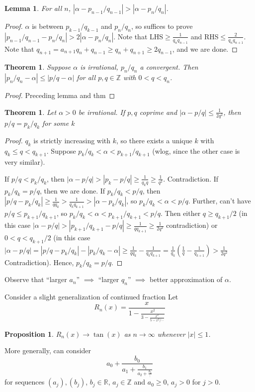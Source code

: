 \documentclass{article}
\theoremstyle{definition}
\theoremstyle{remark}
\theoremstyle{plain}
\newtheorem{lem}[defn]{Lemma}
\newtheorem{thm}[defn]{Theorem}
\newtheorem{prop}[defn]{Proposition}
\newcommand{\ZZ}{\mathbb{Z}}
\newcommand{\RR}{\mathbb{R}}
\begin{document}
\begin{lem}
    For all $n$, $|\alpha-p_{n-1}/q_{n-1}|>|\alpha-p_n/q_n|$.
\end{lem}
\begin{proof}
    $\alpha$ is between $p_{k-1}/q_{k-1}$ and $p_n/q_n$, so suffices to prove $|p_{n-1}/q_{n-1}-p_n/q_n|>2|\alpha-p_n/q_n|$. Note that LHS$\ge\frac{1}{q_nq_{n-1}}$ and RHS$\le\frac{2}{q_nq_{n+1}}$. Note that $q_{n+1}=a_{n+1}q_n+q_{n-1}\ge q_n+q_{n+1}\ge 2q_{n-1}$, and we are done.
\end{proof}
\begin{thm}
    Suppose $\alpha$ is irrational, $p_n/q_n$ a convergent. Then $|p_n/q_n-\alpha|\le |p/q-\alpha|$ for all $p,q\in\ZZ$ with $0<q<q_n$.
\end{thm}
\begin{proof}
    Preceding lemma and thm
\end{proof}
\begin{thm}
    Let $\alpha>0$ be irrational.
    If $p,q$ coprime and $|\alpha-p/q|\le \frac{1}{2q^2}$, then $p/q=p_k/q_k$ for some $k$
\end{thm}
\begin{proof}
    $q_k$ is strictly increasing with $k$, so there exists a unique $k$ with $q_k\le q<q_{k+1}$. Suppose $p_k/q_k<\alpha<p_{k+1}/q_{k+1}$ (wlog, since the other case is very similar).

    If $p/q<p_k/q_k$, then $|\alpha-p/q|>|p_k-p/q|\ge \frac{1}{q_kq}\ge \frac{1}{q^2}$. Contradiction. If $p_k/q_k=p/q$, then we are done. If $p_k/q_k<p/q$, then $|p/q-p_k/q_k|\ge \frac{1}{qq_k}>\frac{1}{q_kq_{k+1}}>|\alpha-p_k/q_k|$, so $p_k/q_k<\alpha<p/q$. Further, can't have $p/q\le p_{k+1}/q_{k+1}$, so $p_k/q_k<\alpha<p_{k+1}/q_{k+1}<p/q$. Then either $q\ge q_{k+1}/2$ (in this case $|\alpha-p/q|>|p_{k+1}/q_{k+1}-p/q|\ge \frac{1}{qq_{k+1}}\ge \frac{1}{2q^2}$ contradiction) or $0<q<q_{k+1}/2$ (in this case $|\alpha-p/q|=|p/q-p_k/q_k|-|p_k/q_k-\alpha|\ge\frac{1}{qq_k}-\frac{1}{q_kq_{k+1}}=\frac{1}{q_k}(\frac{1}{q}-\frac{1}{q_{k+1}})>\frac{1}{2q^2}$ Contradiction). Hence, $p_k/q_k=p/q$. 
\end{proof}
Observe that ``larger $a_n$'' $\implies$ ``larger $q_n$'' $\implies$ better approximation of $\alpha$.

Consider a slight generalization of continued fraction
Let \[R_n(x)=\frac{x}{1-\frac{x^2}{3-\frac{x^2}{5-x^2/\cdots}}}\]
\begin{prop}
    $R_n(x)\to\tan(x)$ as $n\to\infty$ whenever $|x|\le 1$.
\end{prop}
More generally, can consider
\[a_0+\frac{b_0}{a_1+\frac{b_1}{a_2+\frac{b_2}{\vdots}}}\]
for sequences $(a_j),(b_j)$, $b_j\in\RR$, $a_j\in\ZZ$ and $a_0\ge 0$, $a_j>0$ for $j>0$.
\end{document}
